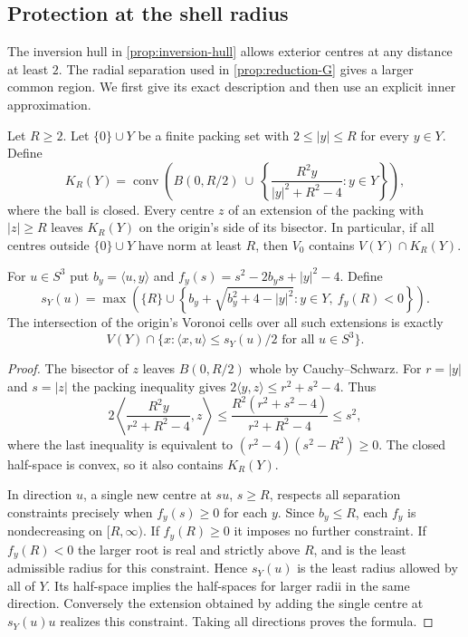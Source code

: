 \subsection{Protection at the shell radius}
\label{shell-protect:sec}

The inversion hull in \cref{prop:inversion-hull} allows exterior centres
at any distance at least $2$. The radial separation used in
\cref{prop:reduction-G} gives a larger common region. We first give its
exact description and then use an explicit inner approximation.

\begin{prop}
\label{shell-protect:prop}
Let $R\ge2$. Let $\{0\}\cup Y$ be a finite packing set with
$2\le |y|\le R$ for every $y\in Y$. Define
\[
 K_R(Y)=\operatorname{conv}\left(
 B(0,R/2)\ \cup\
 \left\{\frac{R^2y}{|y|^2+R^2-4}:y\in Y\right\}\right),
\]
where the ball is closed. Every centre $z$ of an extension of the
packing with $|z|\ge R$ leaves $K_R(Y)$ on the origin's side of its
bisector. In particular, if all centres outside $\{0\}\cup Y$ have
norm at least $R$, then $V_0$ contains $V(Y)\cap K_R(Y)$.

For $u\in S^3$ put $b_y=\langle u,y\rangle$ and
$f_y(s)=s^2-2b_ys+|y|^2-4$. Define
\[
 s_Y(u)=\max\!\left(
 \{R\}\cup
 \left\{b_y+\sqrt{b_y^2+4-|y|^2}:y\in Y,\ f_y(R)<0\right\}
 \right).
\]
The intersection of the origin's Voronoi cells over all such extensions is
exactly
\[
 V(Y)\cap\{x:\langle x,u\rangle\le s_Y(u)/2\text{ for all }u\in S^3\}.
\]
\end{prop}

\begin{proof}
The bisector of $z$ leaves $B(0,R/2)$ whole by Cauchy--Schwarz. For
$r=|y|$ and $s=|z|$ the packing inequality gives
$2\langle y,z\rangle\le r^2+s^2-4$. Thus
\[
 2\left\langle\frac{R^2y}{r^2+R^2-4},z\right\rangle
 \le\frac{R^2(r^2+s^2-4)}{r^2+R^2-4}\le s^2,
\]
where the last inequality is equivalent to
$(r^2-4)(s^2-R^2)\ge0$. The closed half-space is convex,
so it also contains $K_R(Y)$.

In direction $u$, a single new centre at $su$, $s\ge R$, respects all
separation constraints precisely when $f_y(s)\ge0$ for each $y$.
Since $b_y\le R$, each $f_y$ is nondecreasing on $[R,\infty)$.
If $f_y(R)\ge0$ it imposes no further constraint. If $f_y(R)<0$
the larger root is real and strictly above $R$, and is the least
admissible radius for this constraint. Hence $s_Y(u)$ is the least
radius allowed by all of $Y$. Its half-space implies the half-spaces
for larger radii in the same direction. Conversely the extension
obtained by adding the single centre at $s_Y(u)u$ realizes this
constraint. Taking all directions proves the formula.
\end{proof}

